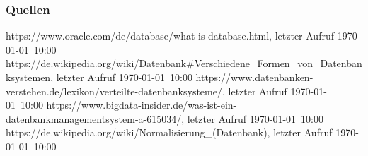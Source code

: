 \documentclass[aspectratio=169,14pt,xcolor=dvipsnames]{beamer}
\begin{document}
\begin{frame}[t]
    \frametitle{Quellen}
    \scriptsize https://www.oracle.com/de/database/what-is-database.html, \newline letzter Aufruf \today\ 10:00\newline \newline
    \scriptsize https://de.wikipedia.org/wiki/Datenbank\#Verschiedene\_Formen\_von\_Datenbanksystemen, \newline letzter Aufruf \today\  10:00\newline \newline
    \scriptsize https://www.datenbanken-verstehen.de/lexikon/verteilte-datenbanksysteme/, \newline letzter Aufruf \today\  10:00\newline \newline
    \scriptsize https://www.bigdata-insider.de/was-ist-ein-datenbankmanagementsystem-a-615034/, \newline letzter Aufruf \today\  10:00\newline \newline
    \scriptsize https://de.wikipedia.org/wiki/Normalisierung\_(Datenbank), \newline letzter Aufruf \today\  10:00\newline \newline
\end{frame}
\end{document}
